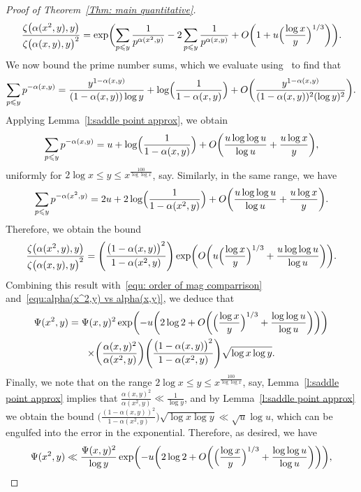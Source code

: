\documentclass[10pt,a4paper]{amsart}
\def\leq {\leqslant}
\begin{document}
\begin{proof}[Proof of Theorem~\ref{Thm: main quantitative}]
\[
\frac{\zeta \bigl( \alpha (x^2, y), y \bigr)}{\zeta \bigl( \alpha (x,y), y \bigr)^2} = \exp \biggl( \sum_{p \leq y} \frac{1}{p^{\alpha(x^2, y)}} - 2 \sum_{p \leq y} \frac{1}{p^{\alpha (x,y)}} + O \biggl(1 +  u \Bigl( \frac{\log x}{y} \Bigr)^{1/3} \biggr) \biggr).
\]
We now bound the prime number sums, which we evaluate using~\cite[Lemma~7.4]{MV2007} to find that
\[
\sum_{p \leq y} p^{-\alpha (x, y)} = \frac{y^{1 - \alpha(x,y)}}{(1 - \alpha(x,y)) \log y} +  \log \Bigl( \frac{1}{1 - \alpha(x,y)} \Bigr) + O \biggl( \frac{y^{1 - \alpha(x,y)}}{(1 - \alpha(x,y))^2 (\log y)^2} \biggr).
\]
Applying Lemma~\ref{l:saddle point approx}, we obtain
\[
\sum_{p \leq y} p^{-\alpha (x, y)} = u + \log \Bigl( \frac{1}{1 - \alpha(x,y)} \Bigr) + O \biggl( \frac{u \log \log u}{\log u} + \frac{u \log x}{y}\biggr),
\]
uniformly for $2 \log x \leq y \leq x^{\frac{100}{\log \log x}}$, say. Similarly, in the same range, we have 
\[
\sum_{p \leq y} p^{-\alpha (x^2 , y)} = 2u + 2 \log \Bigl( \frac{1}{1 - \alpha(x^2 ,y)} \Bigr) + O \biggl( \frac{u \log \log u}{\log u} + \frac{u \log x}{y}\biggr).
\]
Therefore, we obtain the bound
\[
\frac{\zeta \bigl( \alpha (x^2, y), y \bigr)}{\zeta \bigl( \alpha (x,y), y \bigr)^2} = \Biggl( \frac{\bigl( 1 - \alpha (x,y) \bigr)^2}{1 - \alpha (x^2 ,y)} \Biggr)  \exp \biggl( O \biggl( u \Bigl( \frac{\log x}{y} \Bigr)^{1/3} + \frac{u \log \log u}{\log u} \biggr) \biggr).
\]
Combining this result with~\eqref{equ: order of mag comparrison} and~\eqref{equ:alpha(x^2,y) vs alpha(x,y)}, we deduce that
\begin{multline*}
\Psi (x^2, y) = \Psi(x,y)^2 \exp \biggl( - u \biggl( 2 \log 2 + O \biggl( \Bigl( \frac{\log x}{y} \Bigr)^{1/3} + \frac{\log \log u}{\log u} \biggr) \biggr) \biggr) \\ \times \biggl( \frac{\alpha(x,y)^2}{\alpha(x^2, y)} \biggr) \Biggl( \frac{\bigl( 1 - \alpha (x,y) \bigr)^2}{1 - \alpha (x^2 ,y)} \Biggr) \sqrt{\log x \log y}.
\end{multline*}
Finally, we note that on the range $2 \log x \leq y \leq x^{\frac{100}{\log \log x}}$, say, Lemma~\ref{l:saddle point approx} implies that $\frac{\alpha(x,y)^2}{\alpha(x^2, y)} \ll \frac{1}{\log y}$, and by Lemma~\ref{l:saddle point approx} we obtain the bound $\bigl( \frac{( 1 - \alpha (x,y) )^2}{1 - \alpha (x^2 ,y)} \bigr) \sqrt{\log x \log y} \ll \sqrt{u} \log u$, which can be engulfed into the error in the exponential. Therefore, as desired, we have
\[
\Psi (x^2, y) \ll \frac{\Psi(x,y)^2}{\log y} \exp \biggl( - u \biggl( 2 \log 2 + O \biggl( \Bigl( \frac{\log x}{y} \Bigr)^{1/3} + \frac{\log \log u}{\log u} \biggr) \biggr) \biggr),
\]
\end{proof}
\end{document}
